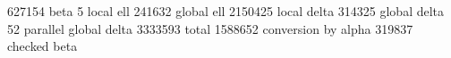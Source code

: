  627154 beta
      5 local ell
 241632 global ell
2150425 local delta
 314325 global delta
     52 parallel global delta
3333593 total
1588652 conversion by alpha
 319837 checked beta
